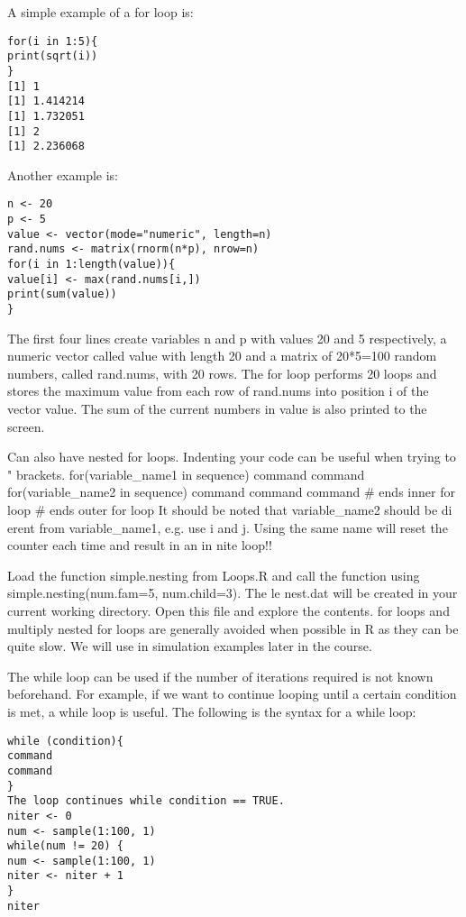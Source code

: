 A simple example of a for loop is:
\begin{verbatim}
for(i in 1:5){
print(sqrt(i))
}
[1] 1
[1] 1.414214
[1] 1.732051
[1] 2
[1] 2.236068
\end{verbatim}

Another example is:
\begin{verbatim}
n <- 20
p <- 5
value <- vector(mode="numeric", length=n)
rand.nums <- matrix(rnorm(n*p), nrow=n)
for(i in 1:length(value)){
value[i] <- max(rand.nums[i,])
print(sum(value))
}
\end{verbatim}
The first four lines create variables n and p with values 20 and 5
respectively, a numeric vector called value with length 20 and a
matrix of 20*5=100 random numbers, called rand.nums, with 20
rows.
The for loop performs 20 loops and stores the maximum value
from each row of rand.nums into position i of the vector value.
The sum of the current numbers in value is also printed to the
screen.

Can also have nested for loops. Indenting your code can be useful
when trying to \match" brackets.
for(variable_name1 in sequence) {
command
command
for(variable_name2 in sequence) {
command
command
command
} # ends inner for loop
} # ends outer for loop
It should be noted that variable_name2 should be di erent from
variable_name1, e.g. use i and j. Using the same name will
reset the counter each time and result in an in nite loop!!


Load the function simple.nesting from Loops.R and call the
function using
simple.nesting(num.fam=5, num.child=3).
The le nest.dat will be created in your current working
directory. Open this file and explore the contents.
for loops and multiply nested for loops are generally avoided
when possible in R as they can be quite slow. We will use in
simulation examples later in the course.


The while loop can be used if the number of iterations required is
not known beforehand. For example, if we want to continue
looping until a certain condition is met, a while loop is useful.
The following is the syntax for a while loop:
\begin{verbatim}
while (condition){
command
command
}
The loop continues while condition == TRUE.
niter <- 0
num <- sample(1:100, 1)
while(num != 20) {
num <- sample(1:100, 1)
niter <- niter + 1
}
niter
    
\end{verbatim}

